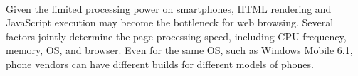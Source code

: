%




\label{sec:web_js}

\begin{figure}[t]
\centering
{}\\
\label{fig:web_js}
\end{figure}


Given the limited processing power on smartphones, HTML rendering 
and JavaScript execution may become the bottleneck for web browsing. 
Several factors jointly determine the page processing speed, 
including CPU frequency, memory, OS, and browser.
Even for the same OS, such as Windows Mobile 6.1, phone vendors 
can have different builds for different models of phones.

